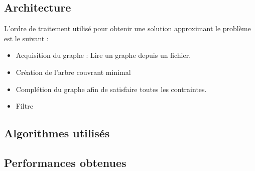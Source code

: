 \documentclass[a4paper,12pt]{article}
\begin{document}
\subsection{Architecture}
L'ordre de traitement utilisé pour obtenir une solution approximant
le problème est le suivant :

\begin{itemize}
\item Acquisition du graphe : Lire un graphe depuis un fichier.
\item Création de l'arbre couvrant minimal
\item Complétion du graphe afin de satisfaire toutes les contraintes.
\item Filtre
\end{itemize}

\subsection{Algorithmes utilisés}

\subsection{Performances obtenues}
\end{document}
